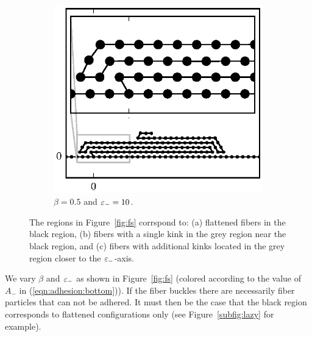 \begin{figure}[h!]
		\begin{subfigure}{.5\textwidth}
			\centering
			\includegraphics{./fig/ch3/fs/b0.5_eb10.eps}
			\caption{$\beta=0.5$ and $\varepsilon_-=10$.\label{subfig:lazy_many_loops}}
		\end{subfigure}		
		\caption{The regions in Figure~\ref{fig:fs} corrspond to: (a) flattened fibers in the black region, (b) fibers with a single kink in the grey region near the black region, and (c) fibers with additional kinks located in the grey region closer to the $\varepsilon_-$-axis.\label{fig:lazy}}	
	\end{figure}

We vary $\beta$ and $\varepsilon_-$ as shown in Figure~\ref{fig:fs} (colored according to the value of $A_-$ in (\ref{eqn:adhesion:bottom})). If the fiber buckles there are necessarily fiber particles that can not be adhered. It must then be the case that the black region corresponds to flattened configurations only (see Figure~\ref{subfig:lazy} for example). 

